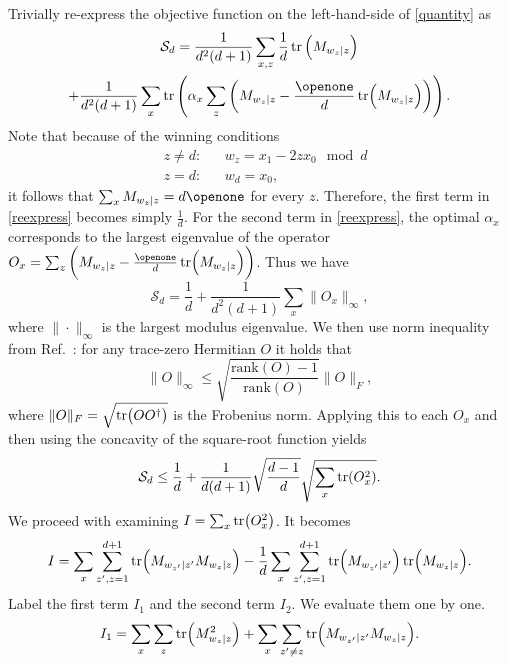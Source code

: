 \documentclass[aps,superscriptaddress,twocolumn,twoside,floatfix,pra,nofootinbib,a4paper]{revtex4-2}
\begin{document}
Trivially re-express the objective function on the left-hand-side of \eqref{quantity} as
\begin{multline}\label{reexpress}
\mathcal{S}_d=\frac{1}{d^2(d+1)}\sum_{x,z} \frac{1}{d}\tr\left(M_{w_z|z}\right)\\
+\frac{1}{d^2(d+1)}\sum_{x} \tr\left(\alpha_x \sum_z \left(M_{w_z|z}-\frac{\openone}{d}\tr(M_{w_z|z})\right)\right).
\end{multline}
Note that because of the winning conditions
\begin{align}\nonumber
&z\neq d:  &&w_z=x_1-2zx_0 \mod{d} \\
&z=d: && w_d=x_0,
\end{align}
it follows that  $\sum_x M_{w_z|z}=d\openone$ for every $z$. Therefore, the first term in \eqref{reexpress} becomes simply $\frac{1}{d}$. For the second term in \eqref{reexpress}, the optimal $\alpha_x$ corresponds to the largest eigenvalue of the operator $O_x=\sum_z \left(M_{w_z|z}-\frac{\openone}{d}\tr(M_{w_z|z})\right)$. Thus we have
\begin{equation}
\mathcal{S}_d=\frac{1}{d}+\frac{1}{d^2(d+1)}\sum_{x} \|O_x\|_\infty,
\end{equation}
where $\|\cdot \|_\infty$ is the largest modulus eigenvalue.  We then use norm inequality from Ref.~\cite{farkas2023simple}: for any trace-zero Hermitian $O$ it holds that
\begin{equation}
   \|O\|_\infty\leq \sqrt{\frac{\text{rank}(O)-1}{\text{rank}(O)}} \|O\|_F,
\end{equation}
where $\|O\|_F=\sqrt{\tr(OO^\dagger)}$ is the Frobenius norm. Applying this to each $O_x$ and then using the concavity of the square-root function yields
\begin{equation}\label{EqSS}
    \mathcal{S}_d\leq \frac{1}{d}+\frac{1}{d(d+1)}\sqrt{\frac{d-1}{d}} \sqrt{\sum_x \tr(O_x^2)}.
\end{equation}
We proceed with examining $I=\sum_x \tr(O_x^2)$. It becomes 
\begin{equation}\label{EqS}
I=\sum_x \sum_{z',z=1}^{d+1} \tr(M_{w_{z'}|z'}M_{w_z|z}) -\frac{1}{d}\sum_x \sum_{z',z=1}^{d+1} \tr(M_{w_{z'}|z'}) \tr(M_{w_z|z}).
\end{equation}
Label the first term $I_1$ and the second term $I_2$. We evaluate them one by one.
\begin{align}
I_1=\sum_x \sum_{z} \tr(M_{w_z|z}^2)+\sum_x \sum_{z'\neq z} \tr(M_{w_{z'}|z'}M_{w_z|z}).
\end{align}
\end{document}
